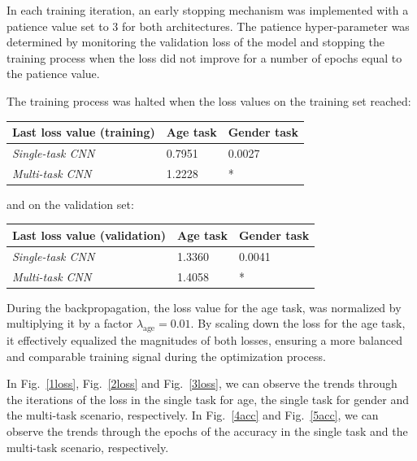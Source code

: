 In each training iteration, an early stopping mechanism was implemented with
a patience value set to 3 for both architectures.
The patience hyper-parameter was determined by monitoring the validation loss
of the model and stopping the training process when the loss
did not improve for a number of epochs equal to the patience value.

The training process was halted when the loss values
on the training set reached: 
\begin{table}[H]
    \centering
    \begin{tabular}{@{}lll@{}}
    \toprule
    Last loss value (training) & \textbf{Age task} & \textbf{Gender task} \\ \midrule
    \textit{Single-task CNN} &  0.7951           & 0.0027               \\
    \textit{Multi-task CNN}  &  1.2228           & *                    \\ \bottomrule
    \end{tabular}
\end{table}
and on the validation set:
\begin{table}[H]
    \centering
    \begin{tabular}{@{}lll@{}}
    \toprule
    Last loss value (validation) & \textbf{Age task} & \textbf{Gender task} \\ \midrule
    \textit{Single-task CNN} &  1.3360           & 0.0041               \\
    \textit{Multi-task CNN}  &  1.4058           & *                    \\ \bottomrule
    \end{tabular}
\end{table}
During the backpropagation, the loss value for the age task, 
was normalized by multiplying it by a factor
$\lambda_{\text{age}} = 0.01$.
By scaling down the loss for the age task, it effectively equalized
the magnitudes of both losses, ensuring a more balanced and comparable
training signal during the optimization process. 

In Fig.~\ref{1loss}, Fig.~\ref{2loss} and Fig.~\ref{3loss},
we can observe the trends through the iterations
of the loss
in the single task for age, the single task for gender
and the multi-task scenario, respectively.
In Fig.~\ref{4acc} and Fig.~\ref{5acc}, we can observe the
trends through the epochs of the accuracy
in the single task
and the multi-task scenario, respectively.

